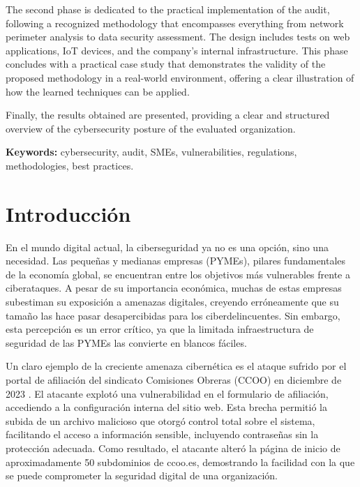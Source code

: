 \documentclass[a4paper, 11pt]{article}
\begin{document}
\par\vspace{0.5cm}

The second phase is dedicated to the practical implementation of the audit, following a recognized methodology that encompasses everything from network perimeter analysis to data security assessment. The design includes tests on web applications, IoT devices, and the company’s internal infrastructure. This phase concludes with a practical case study that demonstrates the validity of the proposed methodology in a real-world environment, offering a clear illustration of how the learned techniques can be applied.

\par\vspace{0.5cm}

Finally, the results obtained are presented, providing a clear and structured overview of the cybersecurity posture of the evaluated organization.
\par\vspace{0.5cm}
\textbf{Keywords:} cybersecurity, audit, SMEs, vulnerabilities, regulations, methodologies, best practices.
\clearpage


\section{Introducción}
\par\vspace{0.5cm}

En el mundo digital actual, la ciberseguridad ya no es una opción, sino una necesidad. Las pequeñas y medianas empresas (PYMEs), pilares fundamentales de la economía global, se encuentran entre los objetivos más vulnerables frente a ciberataques. A pesar de su importancia económica, 
muchas de estas empresas subestiman su exposición a amenazas digitales, creyendo erróneamente que su tamaño las hace pasar desapercibidas para los ciberdelincuentes. Sin embargo, esta percepción es un error crítico, ya que la limitada infraestructura de seguridad de las 
PYMEs las convierte en blancos fáciles. 
\par\vspace{0.5cm}

Un claro ejemplo de la creciente amenaza cibernética es el ataque sufrido por el portal de afiliación del sindicato Comisiones Obreras (CCOO) en diciembre de 2023 \cite{napalm-ccoo}. El atacante explotó una vulnerabilidad en el formulario de afiliación, accediendo a la configuración interna del sitio web. Esta brecha permitió la subida de un archivo malicioso que otorgó control total sobre el sistema, facilitando el acceso a información sensible, incluyendo contraseñas sin la protección adecuada. Como resultado, el atacante alteró la página de inicio de aproximadamente 50 subdominios de ccoo.es, demostrando la facilidad con la que se puede comprometer la seguridad digital de una organización.
\par\vspace{0.5cm}
\end{document}
